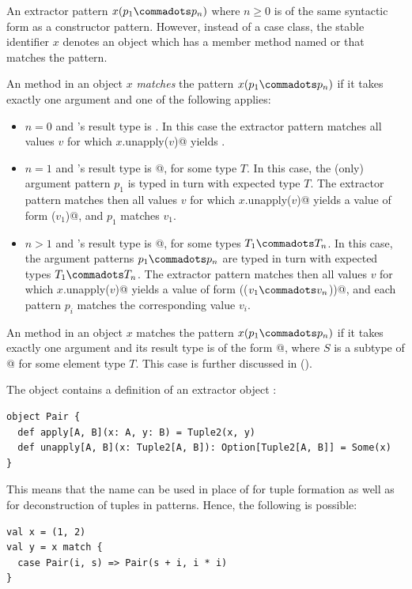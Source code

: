 An extractor pattern $x(p_1 \commadots p_n)$ where $n \geq 0$ is of
the same syntactic form as a constructor pattern. However, instead of
a case class, the stable identifier $x$ denotes an object which has a
member method named  or  that matches
the pattern.

An  method in an object $x$ {\em matches} the pattern
$x(p_1 \commadots p_n)$ if it takes exactly one argument and one of
the following applies:
\begin{itemize}
\item[]
$n=0$ and 's result type is . In this case
the extractor pattern matches all values $v$ for which 
\lstinline@$x$.unapply($v$)@ yields .
\item[]
$n=1$ and 's result type is \lstinline@Option[$T$]@, for some
type $T$.  In this case, the (only) argument pattern $p_1$ is typed in
turn with expected type $T$.  The extractor pattern matches then all
values $v$ for which \lstinline@$x$.unapply($v$)@ yields a value of form
\lstinline@Some($v_1$)@, and $p_1$ matches $v_1$.
\item[]
$n>1$ and 's result type is 
\lstinline@Option[($T_1 \commadots T_n$)]@, for some
types $T_1 \commadots T_n$.  In this case, the argument patterns $p_1
\commadots p_n$ are typed in turn with expected types $T_1 \commadots
T_n$.  The extractor pattern matches then all values $v$ for which
\lstinline@$x$.unapply($v$)@ yields a value of form
\lstinline@Some(($v_1 \commadots v_n$))@, and each pattern
$p_i$ matches the corresponding value $v_i$.
\end{itemize}

An  method in an object $x$ matches the pattern
$x(p_1 \commadots p_n)$ if it takes exactly one argument and its
result type is of the form \lstinline@Option[$S$]@, where $S$ is a subtype of
\lstinline@Seq[$T$]@ for some element type $T$. 
This case is further discussed in ().

\example  The  object contains a definition of an
extractor object :
\begin{lstlisting}
object Pair {
  def apply[A, B](x: A, y: B) = Tuple2(x, y)
  def unapply[A, B](x: Tuple2[A, B]): Option[Tuple2[A, B]] = Some(x)
}
\end{lstlisting}
This means that the name  can be used in place of  for tuple 
formation as well as for deconstruction of tuples in patterns.
Hence, the following is possible:
\begin{lstlisting}
val x = (1, 2)
val y = x match {
  case Pair(i, s) => Pair(s + i, i * i)
}
\end{lstlisting}

